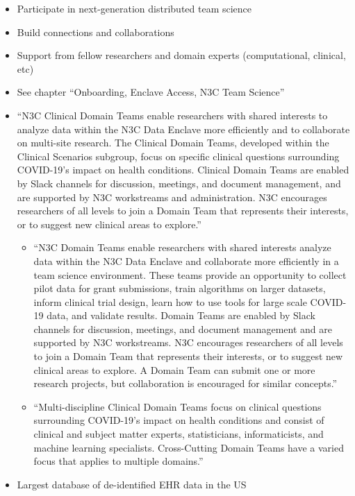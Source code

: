 \documentclass[
  letterpaper,
  DIV=11,
  numbers=noendperiod]{scrreprt}
\providecommand{\tightlist}{%
  \setlength{\itemsep}{0pt}\setlength{\parskip}{0pt}}\usepackage{longtable,booktabs,array}
\begin{document}
\begin{itemize}
\item
  Participate in next-generation distributed team science
\item
  Build connections and collaborations
\item
  Support from fellow researchers and domain experts (computational,
  clinical, etc)
\item
  See chapter ``Onboarding, Enclave Access, N3C Team Science''
\item
  ``N3C Clinical Domain Teams enable researchers with shared interests
  to analyze data within the N3C Data Enclave more efficiently and to
  collaborate on multi-site research. The Clinical Domain Teams,
  developed within the Clinical Scenarios subgroup, focus on specific
  clinical questions surrounding COVID-19's impact on health conditions.
  Clinical Domain Teams are enabled by Slack channels for discussion,
  meetings, and document management, and are supported by N3C
  workstreams and administration. N3C encourages researchers of all
  levels to join a Domain Team that represents their interests, or to
  suggest new clinical areas to explore.''

  \begin{itemize}
  \tightlist
  \item
    ``N3C Domain Teams enable researchers with shared interests analyze
    data within the N3C Data Enclave and collaborate more efficiently in
    a team science environment. These teams provide an opportunity to
    collect pilot data for grant submissions, train algorithms on larger
    datasets, inform clinical trial design, learn how to use tools for
    large scale COVID-19 data, and validate results. Domain Teams are
    enabled by Slack channels for discussion, meetings, and document
    management and are supported by N3C workstreams. N3C encourages
    researchers of all levels to join a Domain Team that represents
    their interests, or to suggest new clinical areas to explore. A
    Domain Team can submit one or more research projects, but
    collaboration is encouraged for similar concepts.''
  \item
    ``Multi-discipline Clinical Domain Teams focus on clinical questions
    surrounding COVID-19's impact on health conditions and consist of
    clinical and subject matter experts, statisticians, informaticists,
    and machine learning specialists. Cross-Cutting Domain Teams have a
    varied focus that applies to multiple domains.''
  \end{itemize}
\item
  Largest database of de-identified EHR data in the US


\end{itemize}
\end{document}

